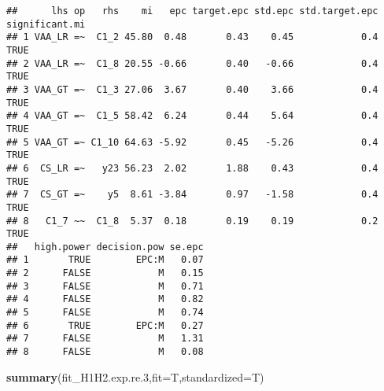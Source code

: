 \documentclass[
]{article}
\newenvironment{Shaded}{\begin{snugshade}}{\end{snugshade}}
\newcommand{\DataTypeTok}[1]{\textcolor[rgb]{0.13,0.29,0.53}{#1}}
\newcommand{\FloatTok}[1]{\textcolor[rgb]{0.00,0.00,0.81}{#1}}
\newcommand{\KeywordTok}[1]{\textcolor[rgb]{0.13,0.29,0.53}{\textbf{#1}}}
\newcommand{\NormalTok}[1]{#1}
\begin{document}
\begin{verbatim}
##      lhs op   rhs    mi   epc target.epc std.epc std.target.epc significant.mi
## 1 VAA_LR =~  C1_2 45.80  0.48       0.43    0.45            0.4           TRUE
## 2 VAA_LR =~  C1_8 20.55 -0.66       0.40   -0.66            0.4           TRUE
## 3 VAA_GT =~  C1_3 27.06  3.67       0.40    3.66            0.4           TRUE
## 4 VAA_GT =~  C1_5 58.42  6.24       0.44    5.64            0.4           TRUE
## 5 VAA_GT =~ C1_10 64.63 -5.92       0.45   -5.26            0.4           TRUE
## 6  CS_LR =~   y23 56.23  2.02       1.88    0.43            0.4           TRUE
## 7  CS_GT =~    y5  8.61 -3.84       0.97   -1.58            0.4           TRUE
## 8   C1_7 ~~  C1_8  5.37  0.18       0.19    0.19            0.2           TRUE
##   high.power decision.pow se.epc
## 1       TRUE        EPC:M   0.07
## 2      FALSE            M   0.15
## 3      FALSE            M   0.71
## 4      FALSE            M   0.82
## 5      FALSE            M   0.74
## 6       TRUE        EPC:M   0.27
## 7      FALSE            M   1.31
## 8      FALSE            M   0.08
\end{verbatim}

\begin{Shaded}
\begin{Highlighting}[]
\KeywordTok{summary}\NormalTok{(fit_H1H2.exp.re}\FloatTok{.3}\NormalTok{,}\DataTypeTok{fit=}\NormalTok{T,}\DataTypeTok{standardized=}\NormalTok{T)}
\end{Highlighting}
\end{Shaded}
\end{document}
